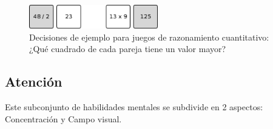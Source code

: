 \begin{itemize}
\begin{figure}[H]
  \begin{center}
    \includegraphics[width=0.5\textwidth]{./images/quantitative-reasoning.png}
    \caption{Decisiones de ejemplo para juegos de razonamiento cuantitativo: ¿Qué cuadrado de cada pareja tiene un valor mayor?}
  \end{center}  
\end{figure}

\end{itemize}

\subsection{Atención}

Este subconjunto de habilidades mentales se subdivide en 2 aspectos: Concentración y Campo visual.

